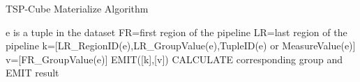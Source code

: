 {\renewcommand\baselinestretch{1} 

\begin{algorithm}[H]
\caption{TSP-Cube Materialize Algorithm}
\label{tscube_mr2}
{\fontfamily{\familydefault}\selectfont

	\begin{algorithmic}[1] %
    	\State e is a tuple in the dataset
    		\State FR=first region of the pipeline
    		\State LR=last region of the pipeline
        	\State k=[LR\_RegionID(e),LR\_GroupValue(e),TupleID(e) or MeasureValue(e)]
        	\State v=[FR\_GroupValue(e)]
        	\State EMIT([k],[v])
        \EndFor
   	 \EndFunction
   	 \State
     			\State
     			CALCULATE corresponding group and EMIT result
     		\EndIf
     	\EndFor
     \EndFunction
	\end{algorithmic}	
}
\end{algorithm}

\par}









